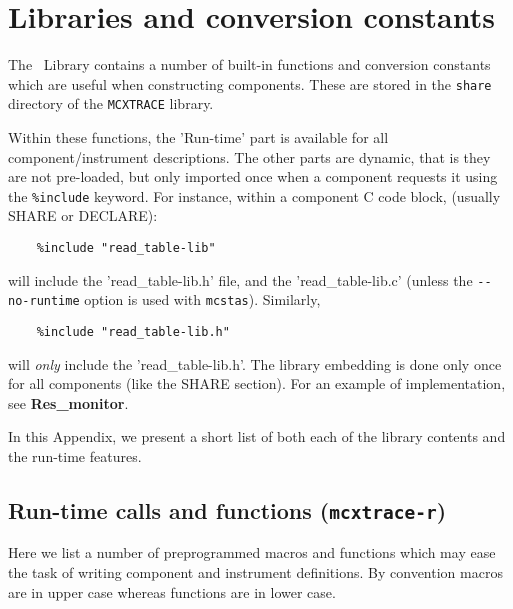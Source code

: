 
\chapter{Libraries and conversion constants}
\label{c:kernelcalls}

The \MCX\ Library contains a number of built-in functions
and conversion constants which are useful when constructing
components. These are stored in the \verb+share+ directory of
the \verb+MCXTRACE+ library. 

Within these functions, the 'Run-time' part is available for all
component/instrument descriptions. The other parts
are dynamic, that is they are not
pre-loaded, but only imported once when a component requests it
using the \verb+%include+ \MCX keyword. For instance, within a
component C code block, (usually SHARE or DECLARE):
\begin{lstlisting}
    %include "read_table-lib"
\end{lstlisting}
will include the 'read\_table-lib.h' file, and the 'read\_table-lib.c'
(unless the \verb+--no-runtime+ option is used with \verb+mcstas+).
Similarly,
\begin{lstlisting}
    %include "read_table-lib.h"
\end{lstlisting}
will \emph{only} include the 'read\_table-lib.h'.
The library embedding is done only once for all components (like the
 SHARE section).  For an example
of implementation, see {\bfseries Res\_monitor}.

In this Appendix, we present a short list of both each of the library contents
and the run-time features.

\section{Run-time calls and functions (\texttt{mcxtrace-r})}
\label{s:calls:run-time}
Here we list a number of preprogrammed macros and functions
which may ease the task of writing component and instrument definitions.
By convention macros are in upper case whereas functions are in lower case.

